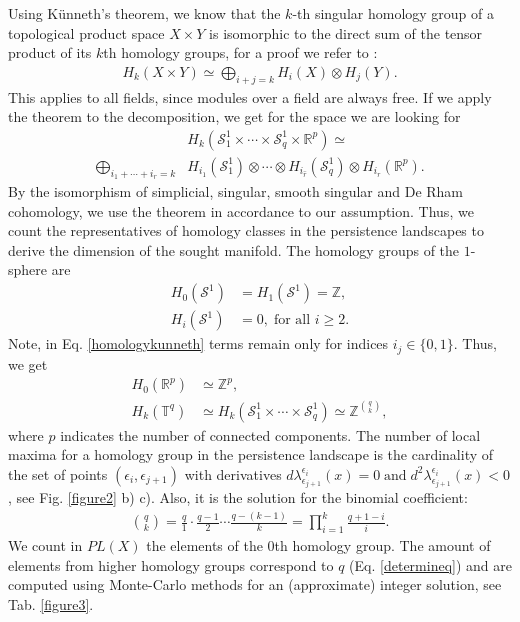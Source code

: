 \documentclass[runningheads,orivec]{llncs}
\begin{document}
Using Künneth's theorem, we know that the $k$-th singular homology group of a topological product space $X \times Y$ is isomorphic to the direct sum of the tensor product of its $k$th homology groups, for a proof we refer to \cite[p.~268]{hatcher2002algebraic}:
\begin{align}
    H_k(X \times Y) \simeq \bigoplus_{i+j=k}H_i(X) \otimes H_j(Y).
\end{align}
This applies to all fields, since modules over a field are always free. If we apply the theorem to the decomposition, we get for the space we are looking for
\begin{align}
    \label{homologykunneth}
    &H_k(\mathcal{S}^{1}_{1}\times\cdots\times \mathcal{S}^{1}_{q}\times\mathbb{R}^p) \simeq \\
    \bigoplus_{i_{1} + \cdots + i_{r}=k} &H_{i_{1}}(\mathcal{S}^{1}_{1}) \otimes \cdots \otimes H_{i_{\hat{r}}}(\mathcal{S}^{1}_{q}) \otimes H_{i_{r}}(\mathbb{R}^{p}).
\end{align}
By the isomorphism of simplicial, singular, smooth singular and De Rham cohomology, we use the theorem in accordance to our assumption. Thus, we count the representatives of homology classes in the persistence landscapes to derive the dimension of the sought manifold. The homology groups of the $1$-sphere are
\begin{align}
    H_0(\mathcal{S}^1) &= H_1(\mathcal{S}^1) = \mathbb{Z},\\
    H_i(\mathcal{S}^1) &= 0, \; \text{for all } i \geq 2.
\end{align}
Note, in Eq. \ref{homologykunneth} terms remain only for indices $i_{j} \in \{0,1\}$. Thus, we get
\begin{align}
    H_0(\mathbb{R}^p) &\simeq\mathbb{Z}^{p},\\
    \label{determineq}
    H_k(\mathbb{T}^{q}) &\simeq H_k(\mathcal{S}^{1}_{1} \times \cdots \times \mathcal{S}^{1}_{q}) \simeq \mathbb{Z}^{{q\choose{k}}},
\end{align}
where $p$ indicates the number of connected components. The number of local maxima for a homology group in the persistence landscape is the cardinality of the set of points $(\epsilon_i,\epsilon_{j+1})$ with derivatives $d\lambda^{\epsilon_i}_{\epsilon_{j+1}}(x) = 0 \; \text{and} \; d^2 \lambda^{\epsilon_i}_{\epsilon_{j+1}}(x) < 0$, see Fig. \ref{figure2} b) c). Also, it is the solution for the binomial coefficient:
\begin{align}
     {q \choose k} = \frac{q}{1} \cdot \frac{q-1}{2} \cdots \frac{q-(k-1)}{k} = \prod_{i=1}^{k} \frac{q+1-i}{i}.
\end{align} 
We count in $PL(X)$ the elements of the $0$th homology group. The amount of elements from higher homology groups correspond to $q$ (Eq. \ref{determineq}) and are computed using Monte-Carlo methods for an (approximate) integer solution, see Tab. \ref{figure3}.
\end{document}
